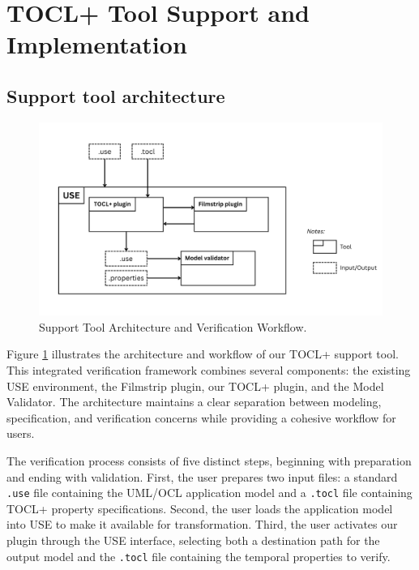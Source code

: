 \section{TOCL+ Tool Support and Implementation}

\subsection{Support tool architecture}

\begin{figure}
    \centering
    \includegraphics[width=1\textwidth]{figures/c3/Architecture_overview.png}
    \caption{Support Tool Architecture and Verification Workflow.}
    \label{sec:plugin_support_tool_architecture}
\end{figure}

\hspace{1cm} Figure \ref{sec:plugin_support_tool_architecture} illustrates the 
architecture and workflow of our TOCL+ support tool. This integrated verification 
framework combines several components: the existing USE environment, the Filmstrip 
plugin, our TOCL+ plugin, and the Model Validator. The architecture maintains a 
clear separation between modeling, specification, and verification concerns while 
providing a cohesive workflow for users.

The verification process consists of five distinct steps, beginning with preparation 
and ending with validation. First, the user prepares two input files: a standard 
\texttt{.use} file containing the UML/OCL application model and a \texttt{.tocl} 
file containing TOCL+ property specifications. Second, the user loads the application 
model into USE to make it available for transformation. Third, the user activates 
our plugin through the USE interface, selecting both a destination path for the 
output model and the \texttt{.tocl} file containing the temporal properties to verify.

